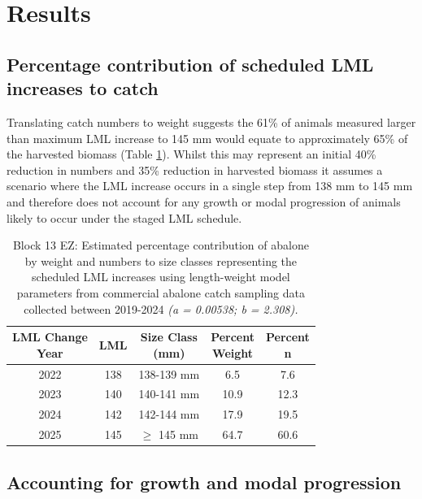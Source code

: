 \documentclass[
]{article}
\begin{document}
\section{Results}\label{results}

\subsection{Percentage contribution of scheduled LML increases to catch}\label{percentage-contribution-of-scheduled-lml-increases-to-catch}

Translating catch numbers to weight suggests the 61\% of animals measured larger than maximum LML increase to 145 mm would equate to approximately 65\% of the harvested biomass (Table \ref{tab:lmlsumtab}). Whilst this may represent an initial 40\% reduction in numbers and 35\% reduction in harvested biomass it assumes a scenario where the LML increase occurs in a single step from 138 mm to 145 mm and therefore does not account for any growth or modal progression of animals likely to occur under the staged LML schedule.

\begin{table}

\caption{\label{tab:lmlsumtab}Block 13 EZ: Estimated percentage contribution of abalone by weight and numbers to size classes representing the scheduled LML increases using length-weight model parameters from commercial abalone catch sampling data collected between 2019-2024\textit{ (a = 0.00538; b = 2.308).}}
\centering
\begin{tabular}[t]{ccccc}
\toprule
\makecell[c]{LML Change\\Year} & LML & \makecell[c]{Size Class\\(mm)} & \makecell[c]{Percent\\Weight} & \makecell[c]{Percent\\n}\\
\midrule
2022 & 138 & 138-139 mm & 6.5 & 7.6\\
2023 & 140 & 140-141 mm & 10.9 & 12.3\\
2024 & 142 & 142-144 mm & 17.9 & 19.5\\
2025 & 145 & $\geq$ 145 mm & 64.7 & 60.6\\
\bottomrule
\end{tabular}
\end{table}

\subsection{Accounting for growth and modal progression}\label{accounting-for-growth-and-modal-progression}
\end{document}

